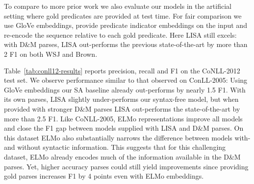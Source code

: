 \documentclass[11pt,a4paper]{article}
\begin{document}
To compare to more prior work we also evaluate our models in the artificial setting where gold predicates are provided at test time. For fair comparison we use GloVe embeddings, provide predicate indicator embeddings on the input and re-encode the sequence relative to each gold predicate. Here LISA still excels: with D\&M parses, LISA out-performs the previous state-of-the-art by more than 2 F1 on both WSJ and Brown. 

Table~\ref{tab:conll12-results} reports precision, recall and F1 on the CoNLL-2012 test set. We observe performance similar to that observed on ConLL-2005: Using GloVe embeddings our SA baseline already out-performs \citet{he2018jointly} by nearly 1.5 F1. With its own parses, LISA slightly under-performs our syntax-free model, but when provided with stronger D\&M parses LISA out-performs the state-of-the-art by more than 2.5 F1. Like CoNLL-2005, ELMo representations improve all models and close the F1 gap between models supplied with LISA and D\&M parses. On this dataset ELMo also substantially narrows the difference between models with- and without syntactic information. This suggests that for this challenging dataset, ELMo already encodes much of the information available in the D\&M parses. Yet, higher accuracy parses could still yield improvements since providing gold parses increases F1 by 4 points even with ELMo embeddings.
\end{document}
